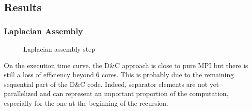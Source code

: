 \documentclass{IOS-Book-Article}
\begin{document}
\subsection{Results}
\subsubsection{Laplacian Assembly}
\begin{figure}[htp]
 \centering
 \hspace{1em}%
 \caption{Laplacian assembly step}
\end{figure}
On the execution time curve, the D\&C approach is close to pure MPI but there is still a loss of efficiency beyond 6 cores.
This is probably due to the remaining sequential part of the D\&C code. Indeed, separator elements are not yet parallelized and can represent an important proportion
of the computation, especially for the one at the beginning of the recursion.
\end{document}
